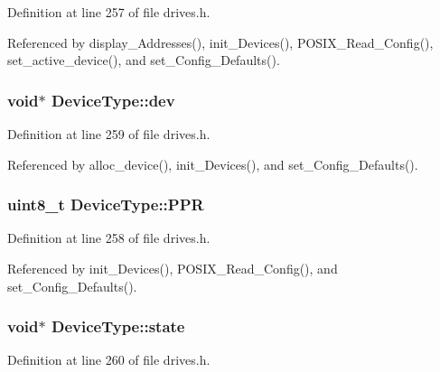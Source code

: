 Definition at line 257 of file drives.\+h.



Referenced by display\+\_\+\+Addresses(), init\+\_\+\+Devices(), P\+O\+S\+I\+X\+\_\+\+Read\+\_\+\+Config(), set\+\_\+active\+\_\+device(), and set\+\_\+\+Config\+\_\+\+Defaults().

\subsubsection[{\texorpdfstring{dev}{dev}}]{\setlength{\rightskip}{0pt plus 5cm}void$\ast$ Device\+Type\+::dev}\hypertarget{structDeviceType_a59fc3b3cb45f8ee0cd1016bd64804d3b}{}\label{structDeviceType_a59fc3b3cb45f8ee0cd1016bd64804d3b}


Definition at line 259 of file drives.\+h.



Referenced by alloc\+\_\+device(), init\+\_\+\+Devices(), and set\+\_\+\+Config\+\_\+\+Defaults().

\subsubsection[{\texorpdfstring{P\+PR}{PPR}}]{\setlength{\rightskip}{0pt plus 5cm}uint8\+\_\+t Device\+Type\+::\+P\+PR}\hypertarget{structDeviceType_ae0e59c6c17582ff80bdab3f2010e8d57}{}\label{structDeviceType_ae0e59c6c17582ff80bdab3f2010e8d57}


Definition at line 258 of file drives.\+h.



Referenced by init\+\_\+\+Devices(), P\+O\+S\+I\+X\+\_\+\+Read\+\_\+\+Config(), and set\+\_\+\+Config\+\_\+\+Defaults().

\subsubsection[{\texorpdfstring{state}{state}}]{\setlength{\rightskip}{0pt plus 5cm}void$\ast$ Device\+Type\+::state}\hypertarget{structDeviceType_ad0fc43d63606bab6c259047e36512e08}{}\label{structDeviceType_ad0fc43d63606bab6c259047e36512e08}


Definition at line 260 of file drives.\+h.



